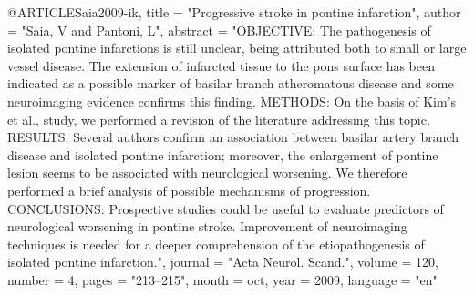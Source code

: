 @ARTICLE{Saia2009-ik,
	title    = "Progressive stroke in pontine infarction",
	author   = "Saia, V and Pantoni, L",
	abstract = "OBJECTIVE: The pathogenesis of isolated pontine infarctions is
	still unclear, being attributed both to small or large vessel
	disease. The extension of infarcted tissue to the pons surface
	has been indicated as a possible marker of basilar branch
	atheromatous disease and some neuroimaging evidence confirms this
	finding. METHODS: On the basis of Kim's et al., study, we
	performed a revision of the literature addressing this topic.
	RESULTS: Several authors confirm an association between basilar
	artery branch disease and isolated pontine infarction; moreover,
	the enlargement of pontine lesion seems to be associated with
	neurological worsening. We therefore performed a brief analysis
	of possible mechanisms of progression. CONCLUSIONS: Prospective
	studies could be useful to evaluate predictors of neurological
	worsening in pontine stroke. Improvement of neuroimaging
	techniques is needed for a deeper comprehension of the
	etiopathogenesis of isolated pontine infarction.",
	journal  = "Acta Neurol. Scand.",
	volume   =  120,
	number   =  4,
	pages    = "213--215",
	month    =  oct,
	year     =  2009,
	language = "en"
}

